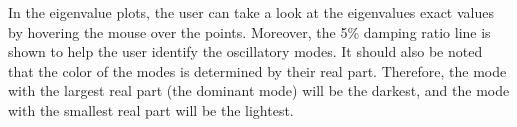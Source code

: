 In the eigenvalue plots, the user can take a look at the eigenvalues exact values
by hovering the mouse over the points. Moreover, the 5\% damping ratio line is shown to help the user identify
the oscillatory modes. It should also be noted that the color of the modes is determined by their real part.
 Therefore, the mode with the largest real part (the dominant mode) will be the darkest, 
 and the mode with the smallest real part will be the lightest.








